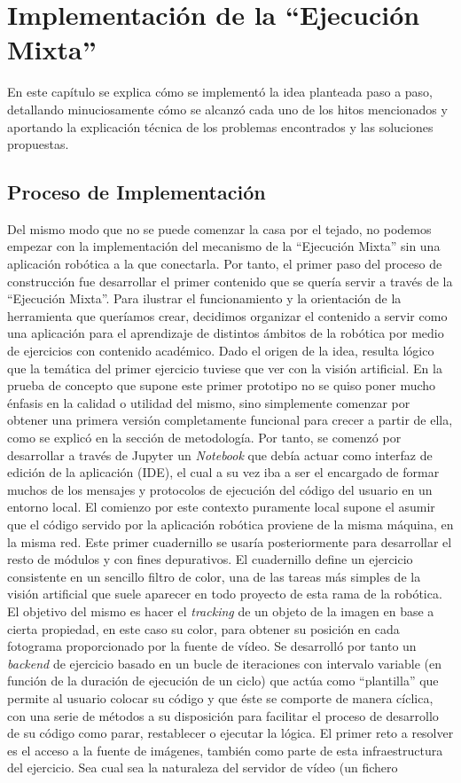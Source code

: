 \chapter{Implementación de la ``Ejecución Mixta''}
En este capítulo se explica cómo se implementó la idea planteada paso a paso, detallando minuciosamente cómo se alcanzó cada uno de los hitos mencionados y aportando la explicación técnica de los problemas encontrados y las soluciones propuestas.

\section{Proceso de Implementación}

Del mismo modo que no se puede comenzar la casa por el tejado, no podemos empezar con la implementación del mecanismo de la ``Ejecución Mixta'' sin una aplicación robótica a la que conectarla. Por tanto, el primer paso del proceso de construcción fue desarrollar el primer contenido que se quería servir a través de la ``Ejecución Mixta''. Para ilustrar el funcionamiento y la orientación de la herramienta que queríamos crear, decidimos organizar el contenido a servir como una aplicación para el aprendizaje de distintos ámbitos de la robótica por medio de ejercicios con contenido académico. Dado el origen de la idea, resulta lógico que la temática del primer ejercicio tuviese que ver con la visión artificial. En la prueba de concepto que supone este primer prototipo no se quiso poner mucho énfasis en la calidad o utilidad del mismo, sino simplemente comenzar por obtener una primera versión completamente funcional para crecer a partir de ella, como se explicó en la sección de metodología. Por tanto, se comenzó por desarrollar a través de Jupyter un \textit{Notebook} que debía actuar como interfaz de edición de la aplicación (IDE), el cual a su vez iba a ser el encargado de formar muchos de los mensajes y protocolos de ejecución del código del usuario en un entorno local. El comienzo por este contexto puramente local supone el asumir que el código servido por la aplicación robótica proviene de la misma máquina, en la misma red. Este primer cuadernillo se usaría posteriormente para desarrollar el resto de módulos y con fines depurativos. El cuadernillo define un ejercicio consistente en un sencillo filtro de color, una de las tareas más simples de la visión artificial que suele aparecer en todo proyecto de esta rama de la robótica. El objetivo del mismo es hacer el \textit{tracking} de un objeto de la imagen en base a cierta propiedad, en este caso su color, para obtener su posición en cada fotograma proporcionado por la fuente de vídeo. Se desarrolló por tanto un \textit{backend} de ejercicio basado en un bucle de iteraciones con intervalo variable (en función de la duración de ejecución de un ciclo) que actúa como ``plantilla'' que permite al usuario colocar su código y que éste se comporte de manera cíclica, con una serie de métodos a su disposición para facilitar el proceso de desarrollo de su código como parar, restablecer o ejecutar la lógica. El primer reto a resolver es el acceso a la fuente de imágenes, también como parte de esta infraestructura del ejercicio. Sea cual sea la naturaleza del servidor de vídeo (un fichero 